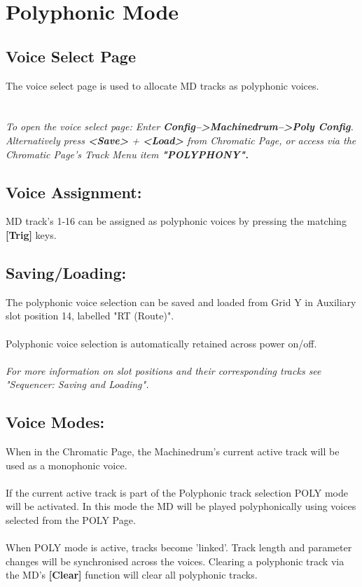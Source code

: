 \chapter{Polyphonic Mode}

\section{Voice Select Page}
The voice select page is used to allocate MD tracks as polyphonic voices.\\
\\\\
\textit{To open the voice select page: Enter \textbf{Config-->Machinedrum-->Poly Config}.\\Alternatively press \textbf{<Save>} + \textbf{<Load>} from  Chromatic Page, or access via the Chromatic Page's Track Menu item \textbf{"POLYPHONY".}}
\section{Voice Assignment:}
MD track's 1-16 can be assigned as polyphonic voices by pressing the matching \textbf{[Trig]} keys.
\section{Saving/Loading:}
The polyphonic voice selection can be saved and loaded from Grid Y in Auxiliary slot position 14, labelled "RT (Route)". 
\\\\Polyphonic voice selection is automatically retained across power on/off.
\\\\
\textit{For more information on slot positions and their corresponding tracks see  "Sequencer: Saving and Loading".}
\section{Voice Modes:}
When in the Chromatic Page, the Machinedrum's current active track will be used as a monophonic voice.\\
\\
If the current active track is part of the Polyphonic track selection POLY mode will be activated. In this mode the MD will be played polyphonically using voices selected from the POLY Page.\\
\\
When POLY mode is active, tracks become 'linked'. Track length and parameter changes will be synchronised across the voices. Clearing a polyphonic track via the MD's \textbf{[Clear]} function will clear all polyphonic tracks.
\newpage
